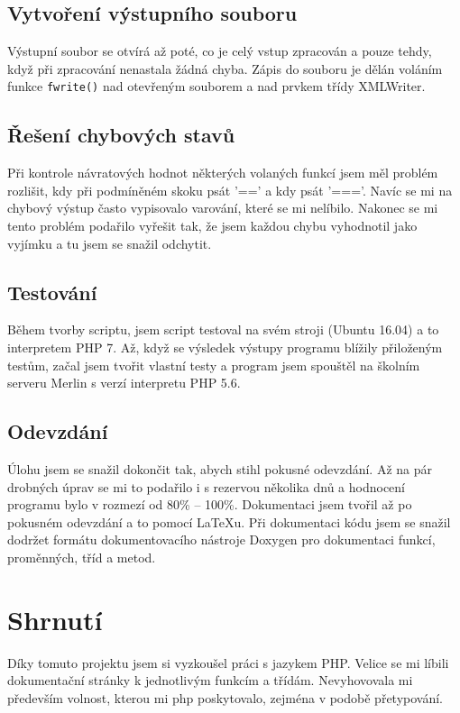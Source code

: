 \documentclass[a4paper, 10pt]{article}
\begin{document}
        \subsection{Vytvoření výstupního souboru}
            Výstupní soubor se otvírá až poté, co je celý vstup zpracován a pouze
            tehdy, když při zpracování nenastala žádná chyba. Zápis do souboru
            je dělán voláním funkce \texttt{fwrite()} nad otevřeným souborem a nad prvkem
            třídy XMLWriter.
        \subsection{Řešení chybových stavů}
            Při kontrole návratových hodnot některých volaných funkcí jsem měl
            problém rozlišit, kdy při podmíněném skoku psát '==' a kdy psát '==='.
            Navíc se mi na chybový výstup často vypisovalo varování, které se mi
            nelíbilo. Nakonec se mi tento problém podařilo vyřešit tak, že jsem
            každou chybu vyhodnotil jako vyjímku a tu jsem se snažil odchytit.
        \subsection{Testování}
            Během tvorby scriptu, jsem script testoval na svém stroji (Ubuntu 16.04)
            a to interpretem PHP 7. Až, když se výsledek výstupy programu blížily
            přiloženým testům, začal jsem tvořit vlastní testy a program jsem spouštěl
            na školním serveru Merlin s verzí interpretu PHP 5.6.
        \subsection{Odevzdání}
            Úlohu jsem se snažil dokončit tak, abych stihl pokusné odevzdání.
            Až na pár drobných úprav se mi to podařilo i s rezervou několika dnů
            a hodnocení programu bylo v rozmezí od 80\% -- 100\%. Dokumentaci jsem
            tvořil až po pokusném odevzdání a to pomocí \LaTeX u. Při dokumentaci kódu jsem se snažil
            dodržet formátu dokumentovacího nástroje Doxygen pro dokumentaci funkcí,
            proměnných, tříd a metod.
    \section{Shrnutí}
        Díky tomuto projektu jsem si vyzkoušel práci s jazykem PHP. Velice se mi
        líbili dokumentační stránky k jednotlivým funkcím a třídám. Nevyhovovala
        mi především volnost, kterou mi php poskytovalo, zejména v podobě
        přetypování.
\end{document}
